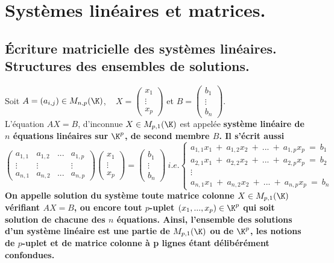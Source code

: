 \documentclass[11pt]{article}
\begin{document}
\section{Systèmes linéaires et matrices.}

\subsection{Écriture matricielle des systèmes linéaires. Structures des ensembles de solutions.}

\begin{defi}{}{}
    Soit $A=(a_{i,j})\in M_{n,p}(\K)$, ~ $X=\begin{pmatrix}x_1\\\vdots\\x_p\end{pmatrix}$ et $B=\begin{pmatrix}b_1\\\vdots\\b_n\end{pmatrix}$.\\
    L'équation $AX=B$, d'inconnue $X\in M_{p,1}(\K)$ est appelée \bf{système linéaire} de $n$ équations linéaires sur $\K^p$, de \bf{second membre} $B$. Il s'écrit aussi
    \begin{equation*}
        \begin{pmatrix}
            a_{1,1} & a_{1,2} & ... & a_{1,p}\\
            \vdots & \vdots & & \vdots\\
            a_{n,1} & a_{n,2} & ... & a_{n,p}
        \end{pmatrix} \begin{pmatrix}
            x_1\\
            \vdots\\
            x_p
        \end{pmatrix} = \begin{pmatrix}
            b_1\\
            \vdots\\
            b_n
        \end{pmatrix} ~ i.e. \begin{cases}
            a_{1,1}x_1 ~+~ a_{1,2}x_2 ~+~ ... ~+~ a_{1,p}x_p ~=~ b_1\\
            a_{2,1}x_1 ~+~ a_{2,2}x_2 ~+~ ... ~+~ a_{2,p}x_p ~=~ b_2\\
            \vdots\\
            a_{n,1}x_1 ~+~ a_{n,2}x_2 ~+~ ... ~+~ a_{n,p}x_p ~=~ b_n
        \end{cases}
    \end{equation*}
    On appelle \bf{solution} du système toute matrice colonne $X\in M_{p,1}(\K)$ vérifiant $AX=B$, ou encore tout $p$-uplet $(x_1,...,x_p)\in\K^p$ qui soit solution de chacune des $n$ équations.\n
    Ainsi, l'ensemble des solutions d'un système linéaire est une partie de $M_{p,1}(\K)$ ou de $\K^p$, les notions de $p$-uplet et de matrice colonne à p lignes étant délibérément confondues.
\end{defi}
\end{document}
